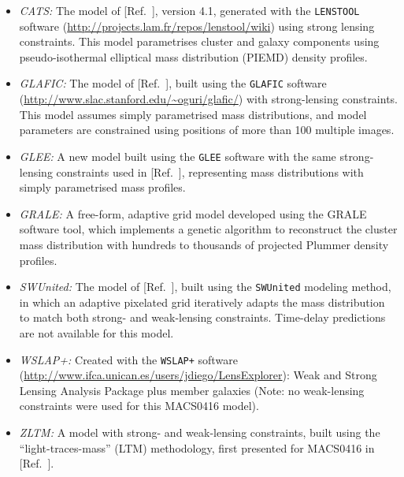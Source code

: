 \documentclass{article}
\newcommand{\citeref}[1]{[Ref.~{\citenum{#1}}]}
\providecommand\citep{\cite}
\providecommand\citet{\cite}
\def\MACS0416{MACS0416\xspace}
\begin{document}
\begin{itemize}
\item{\it CATS:} The model of \citeref{Jauzac:2014}, version 4.1,
  generated with the {\tt LENSTOOL} software
  (\url{http://projects.lam.fr/repos/lenstool/wiki})\citep{Jullo:2007}
  using strong lensing constraints.  This model parametrises cluster
  and galaxy components using pseudo-isothermal elliptical mass
  distribution (PIEMD) density profiles\citep{Kassiola:1993,
    Limousin:2007}.
\item{\it GLAFIC:} The model of \citeref{Kawamata:2016}, built using
  the {\tt GLAFIC} software
  (\url{http://www.slac.stanford.edu/~oguri/glafic/})\citep{Oguri:2010b}
  with strong-lensing constraints. This model assumes simply
  parametrised mass distributions, and model parameters are
  constrained using positions of more than 100 multiple images.
\item{\it GLEE:} A new model built using the {\tt GLEE}
  software\citep{Suyu:2010b, Suyu:2012} with the same strong-lensing
  constraints used in \citeref{Caminha:2017}, representing mass
  distributions with simply parametrised mass profiles.
\item{\it GRALE:} A free-form, adaptive grid model developed using
  the GRALE software tool\citep{Liesenborgs:2006, Liesenborgs:2007,
    Mohammed:2014, Sebesta:2016}, which implements a genetic algorithm
  to reconstruct the cluster mass distribution with hundreds to
  thousands of projected Plummer\citet{Plummer:1911} density profiles.
\item{\it SWUnited:} The model of \citeref{Hoag:2016}, built using the
  {\tt SWUnited} modeling method\citep{Bradac:2005, Bradac:2009}, in
  which an adaptive pixelated grid iteratively adapts the mass
  distribution to match both strong- and weak-lensing constraints.
  Time-delay predictions are not available for this model.
\item{\it WSLAP+:} Created with the {\tt WSLAP+} software
  (\url{http://www.ifca.unican.es/users/jdiego/LensExplorer})\citep{Sendra:2014}:
  Weak and Strong Lensing Analysis Package plus member galaxies (Note:
  no weak-lensing constraints were used for this \MACS0416 model).
\item{\it ZLTM:} A model with strong- and weak-lensing constraints,
  built using the ``light-traces-mass'' (LTM)
  methodology\citep{Zitrin:2009a, Zitrin:2015}, first presented for
  \MACS0416 in \citeref{Zitrin:2013a}.
\end{itemize}
\end{document}
